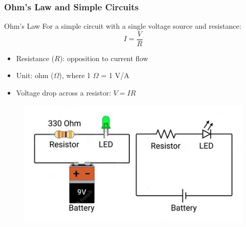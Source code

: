 \documentclass{beamer}
\begin{document}
\begin{frame}
    \frametitle{Ohm's Law and Simple Circuits}
    \begin{block}{Ohm's Law}
        For a simple circuit with a single voltage source and resistance:
        \[ I = \frac{V}{R} \]
    \end{block}
    \begin{itemize}
        \item Resistance ($R$): opposition to current flow
        \item Unit: ohm ($\Omega$), where 1 $\Omega$ = 1 V/A
        \item Voltage drop across a resistor: $V = IR$
    \end{itemize}
    \begin{center}
        \begin{figure}
            \centering
            \includegraphics[width=0.5\linewidth]{phys12-gravity-newtons-law-of-universal-gravitation-formula.jpg}
        \end{figure}
    \end{center}
\end{frame}
\end{document}
